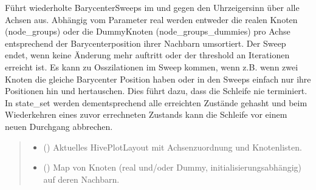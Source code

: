 \documentclass[a4paper,10pt,ngerman]{sphinxmanual}
\begin{document}
\begin{fulllineitems}
\label{\detokenize{api:src.crossing_minimization.barycenter_heuristic}}
\pysigstartsignatures
\pysiglinewithargsret
{}
{\sphinxparamcomma {}\sphinxparamcomma {}\sphinxparamcomma {}\sphinxparamcomma {}\sphinxparamcomma {}\sphinxparamcomma {}}
{}
\pysigstopsignatures
\sphinxAtStartPar
Führt wiederholte Barycenter\sphinxhyphen{}Sweeps im und gegen den Uhrzeigersinn über alle Achsen aus. Abhängig vom Parameter real werden entweder die realen Knoten (node\_groups)
oder die Dummy\sphinxhyphen{}Knoten (node\_groups\_dummies) pro Achse entsprechend der Barycenterposition ihrer Nachbarn umsortiert. Der Sweep endet, wenn keine Änderung mehr auftritt oder der threshold an Iterationen erreicht ist. Es kann zu Osszilationen im Sweep kommen, wenn
z.B. wenn zwei Knoten die gleiche Barycenter Position haben oder in den Sweeps einfach nur ihre Positionen hin\sphinxhyphen{} und hertauschen. Dies führt dazu, dass die Schleife nie terminiert. In state\_set werden dementsprechend alle erreichten Zustände gehasht und beim Wiederkehren eines zuvor errechneten Zustands kann die Schleife vor einem neuen Durchgang abbrechen.
\begin{quote}\begin{description}
\begin{itemize}
\item {} 
\sphinxAtStartPar
{} () \textendash{} Aktuelles HivePlotLayout mit Achsenzuordnung und Knotenlisten.

\item {} 
\sphinxAtStartPar
{} () \textendash{} Map von Knoten (real und/oder Dummy, initialisierungsabhängig) auf deren Nachbarn.


\end{itemize}
\end{description}
\end{quote}
\end{fulllineitems}
\end{document}
